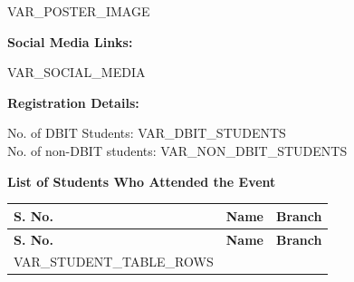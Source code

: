 \documentclass[12pt]{article}
\begin{document}
\vspace{0.2cm}

VAR_POSTER_IMAGE

\vspace{0.6cm}

{\fontsize{12}{14}\selectfont
\textbf{Social Media Links:}

\vspace{0.2cm}

\small
VAR_SOCIAL_MEDIA
}

\vspace{0.6cm}

{\fontsize{12}{14}\selectfont
\textbf{Registration Details:}

\vspace{0.3cm}

No. of DBIT Students: VAR_DBIT_STUDENTS\\
No. of non-DBIT students: VAR_NON_DBIT_STUDENTS
}

\vspace{0.5cm}

\begin{center}
  {\fontsize{12}{14}\selectfont\textbf{List of Students Who Attended the Event}}
\end{center}

\vspace{0.3cm}

\begin{center}
\begin{longtable}{|>{\centering\arraybackslash}p{1.5cm}|>{\raggedright\arraybackslash}p{7.5cm}|>{\centering\arraybackslash}p{3.5cm}|}
\hline
\textbf{S. No.} & \textbf{Name} & \textbf{Branch} \\
\hline
\endfirsthead
\hline
\textbf{S. No.} & \textbf{Name} & \textbf{Branch} \\
\hline
\endhead
VAR_STUDENT_TABLE_ROWS
\end{longtable}
\end{center}

\vspace{0.6cm}
\end{document}
